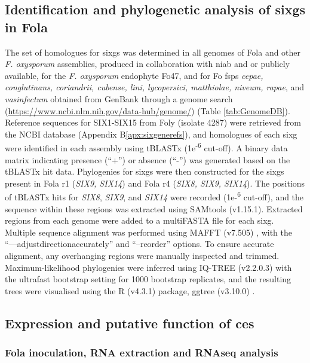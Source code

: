 \subsection{Identification and phylogenetic analysis of \aclp{sixg} in \acl{Fola}}

The set of homologues for \acp{sixg} was determined in all genomes of \ac{Fola} and other \textit{F. oxysporum} assemblies, produced in collaboration with \ac{niab} and or publicly available, for the \textit{F. oxysporum} endophyte Fo47, and for \ac{Fo} \acp{fsp} \textit{cepae, conglutinans, coriandrii, cubense, lini, lycopersici, matthiolae, niveum, rapae}, and \textit{vasinfectum} obtained from GenBank through a genome search (\href{https://www.ncbi.nlm.nih.gov/data-hub/genome/}{https://www.ncbi.nlm.nih.gov/data-hub/genome/}) (Table \ref{tab:GenomeDB}). Reference sequences for SIX1-SIX15 from \ac{Foly} (isolate 4287) were retrieved from the NCBI database (Appendix B\ref{apx:sixgenerefs}), and homologues of each \ac{sixg} were identified in each assembly using tBLASTx (1e\textsuperscript{-6} cut-off). A binary data matrix indicating presence (“+”) or absence (“-”) was generated based on the tBLASTx hit data. Phylogenies for \acp{sixg} were then constructed for the \acp{sixg} present in \ac{Fola} \ac{r1} (\textit{SIX9, SIX14}) and \ac{Fola} \ac{r4} (\textit{SIX8, SIX9, SIX14}). The positions of tBLASTx hits for \textit{SIX8}, \textit{SIX9}, and \textit{SIX14} were recorded (1e-\textsuperscript{6} cut-off), and the sequence within these regions was extracted using SAMtools (v1.15.1). Extracted regions from each genome were added to a multiFASTA file for each \ac{sixg}. Multiple sequence alignment was performed using MAFFT (v7.505) \parencite{Katoh2019}, with the “—adjustdirectionaccurately” and “–reorder” options. To ensure accurate alignment, any overhanging regions were manually inspected and trimmed. Maximum-likelihood phylogenies were inferred using IQ-TREE (v2.2.0.3) \parencite{Nguyen2015} with the ultrafast bootstrap setting for 1000 bootstrap replicates, and the resulting trees were visualised using the R (v4.3.1)  \parencite{R} package, ggtree (v3.10.0) \parencite{ggtree}.


\subsection{Expression and putative function of \aclp{ce}}

\subsubsection{\Acf{Fola} inoculation, RNA extraction and RNAseq analysis}

